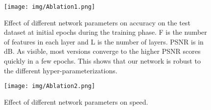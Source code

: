 \documentclass[10pt,twocolumn,letterpaper]{article}
\begin{document}
 \begin{table}[]
\centering
{}
\caption{Comparison results for 256256 outputs. Our method is trained with \textbf{whole-faces}.}
\label{tab:comparison_256}
\end{table}


 
\begin{figure}
\centering
  \texttt{[image: img/Ablation1.png]}
  \vspace{-2mm}
  \caption{Effect of different network parameters on accuracy on the test dataset at initial epochs during the training phase. F is the number of features in each layer and L is the number of layers. PSNR is in dB. As visible, most versions converge to the higher PSNR scores quickly in a few epochs. This shows that our network is robust to the different hyper-parameterizations.}
  \label{fig:ab1}
\end{figure}
 \begin{figure}
\centering
  \texttt{[image: img/Ablation2.png]}
    \vspace{-2mm}
  \caption{Effect of different network parameters on speed.}
  \label{fig:ab2}
\end{figure}
 
\end{document}
